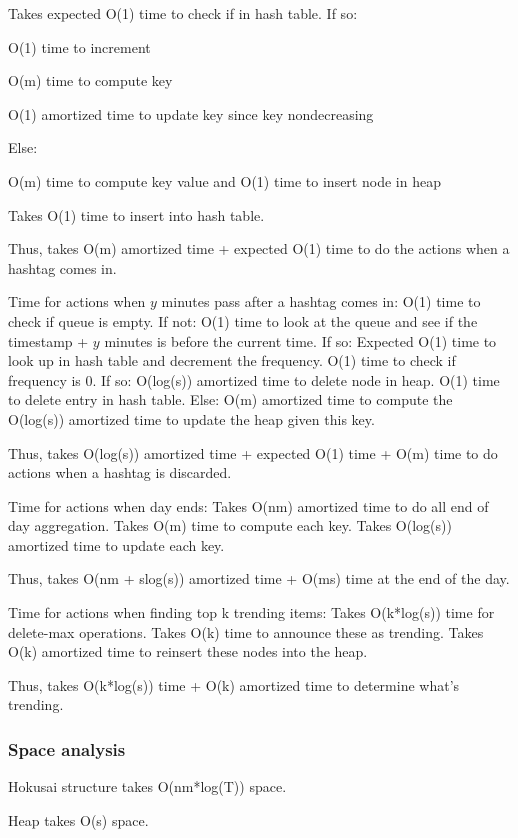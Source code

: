 \documentclass[a4paper,12pt]{article}
\begin{document}
	Takes expected O(1) time to check if in hash table.  If so:

		O(1) time to increment

		O(m) time to compute key 

		O(1) amortized time to update key since key nondecreasing

	Else: 

		O(m) time to compute key value and O(1) time to insert node in heap

		Takes O(1) time to insert into hash table. 


Thus, takes O(m) amortized time + expected O(1) time to do the actions when a hashtag comes in.


Time for actions when $y$ minutes pass after a hashtag comes in:
	O(1) time to check if queue is empty.  If not:
		O(1) time to look at the queue and see if the timestamp + $y$ minutes is before the current time.  If so:
			Expected O(1) time to look up in hash table and decrement the frequency.
			O(1) time to check if frequency is 0.  If so:
				O(log(s)) amortized time to delete node in heap.
				O(1) time to delete entry in hash table.
			Else:
				O(m) amortized time to compute the 
				O(log(s)) amortized time to update the heap given this key.

Thus, takes O(log(s)) amortized time + expected O(1) time  + O(m) time to do actions when a hashtag is discarded.
			

Time for actions when day ends:
Takes O(nm) amortized time to do all end of day aggregation.
Takes O(m) time to compute each key.
Takes O(log(s)) amortized time to update each key.

Thus, takes O(nm + slog(s)) amortized time + O(ms) time at the end of the day.

Time for actions when finding top k trending items:
	Takes O(k*log(s)) time for delete-max operations.
	Takes O(k) time to announce these as trending.
Takes O(k) amortized time to reinsert these nodes into the heap.

Thus, takes O(k*log(s)) time + O(k) amortized time to determine what’s trending.



\subsubsection{Space analysis}

Hokusai structure takes O(nm*log(T)) space.

Heap takes O(s) space.
\end{document}
